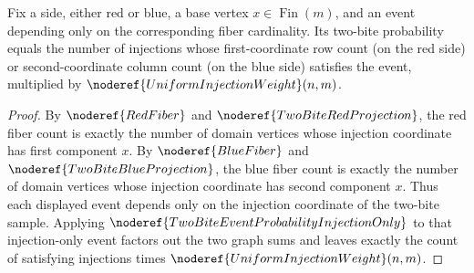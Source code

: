 \begin{lemma}
Fix a side, either red or blue, a base vertex \(x\in \operatorname{Fin}(m)\),
and an event depending only on the corresponding fiber cardinality.  Its
two-bite probability equals the number of injections whose first-coordinate
row count (on the red side) or second-coordinate column count (on the blue
side) satisfies the event, multiplied by
\(\noderef{UniformInjectionWeight}(n,m)\).
\end{lemma}
\begin{proof}
By \(\noderef{RedFiber}\) and \(\noderef{TwoBiteRedProjection}\), the red
fiber count is exactly the number of domain vertices whose injection coordinate
has first component \(x\).  By \(\noderef{BlueFiber}\) and
\(\noderef{TwoBiteBlueProjection}\), the blue fiber count is exactly the number
of domain vertices whose injection coordinate has second component \(x\).
Thus each displayed event depends only on the injection coordinate of the
two-bite sample.  Applying \(\noderef{TwoBiteEventProbabilityInjectionOnly}\)
to that injection-only event factors out the two graph sums and leaves exactly
the count of satisfying injections times
\(\noderef{UniformInjectionWeight}(n,m)\).
\end{proof}
